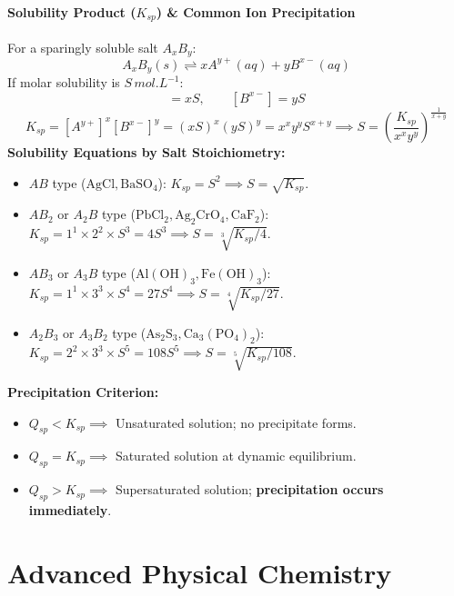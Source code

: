 \documentclass[10pt,twoside,openright]{book}
\begin{document}
\subsection{Solubility Product ($K_{sp}$) \& Common Ion Precipitation}
For a sparingly soluble salt $A_x B_y$:
\begin{equation}
  A_x B_y(s) \rightleftharpoons x A^{y+}(aq) + y B^{x-}(aq)
\end{equation}
If molar solubility is $S\,\si{mol.L^{-1}}$:
\begin{equation}
  [A^{y+}] = x S, \qquad [B^{x-}] = y S
\end{equation}
\begin{equation}
  K_{sp} = [A^{y+}]^x [B^{x-}]^y = (x S)^x (y S)^y = x^x y^y S^{x+y} \implies S = \left(\frac{K_{sp}}{x^x y^y}\right)^{\frac{1}{x+y}}
\end{equation}
\textbf{Solubility Equations by Salt Stoichiometry:}
\begin{itemize}
  \item $AB$ type ($\mathrm{AgCl, BaSO_4}$): $K_{sp} = S^2 \implies S = \sqrt{K_{sp}}$.
  \item $AB_2$ or $A_2B$ type ($\mathrm{PbCl_2, Ag_2CrO_4, CaF_2}$): $K_{sp} = 1^1 \times 2^2 \times S^3 = 4S^3 \implies S = \sqrt[3]{K_{sp}/4}$.
  \item $AB_3$ or $A_3B$ type ($\mathrm{Al(OH)_3, Fe(OH)_3}$): $K_{sp} = 1^1 \times 3^3 \times S^4 = 27S^4 \implies S = \sqrt[4]{K_{sp}/27}$.
  \item $A_2B_3$ or $A_3B_2$ type ($\mathrm{As_2S_3, Ca_3(PO_4)_2}$): $K_{sp} = 2^2 \times 3^3 \times S^5 = 108S^5 \implies S = \sqrt[5]{K_{sp}/108}$.
\end{itemize}
\textbf{Precipitation Criterion:}
\begin{itemize}
  \item $Q_{sp} < K_{sp} \implies$ Unsaturated solution; no precipitate forms.
  \item $Q_{sp} = K_{sp} \implies$ Saturated solution at dynamic equilibrium.
  \item $Q_{sp} > K_{sp} \implies$ Supersaturated solution; \textbf{precipitation occurs immediately}.
\end{itemize}

\part{Advanced Physical Chemistry}
\end{document}
